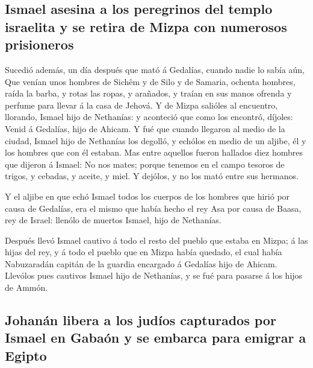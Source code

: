 \hypertarget{ismael-asesina-a-los-peregrinos-del-templo-israelita-y-se-retira-de-mizpa-con-numerosos-prisioneros}{%
\subsection{Ismael asesina a los peregrinos del templo israelita y se
retira de Mizpa con numerosos
prisioneros}\label{ismael-asesina-a-los-peregrinos-del-templo-israelita-y-se-retira-de-mizpa-con-numerosos-prisioneros}}

 Sucedió además, un día después que mató á Gedalías, cuando
nadie lo sabía aún,  Que venían unos hombres de Sichêm y de
Silo y de Samaria, ochenta hombres, raída la barba, y rotas las ropas, y
arañados, y traían en sus manos ofrenda y perfume para llevar á la casa
de Jehová.  Y de Mizpa salióles al encuentro, llorando,
Ismael hijo de Nethanías: y aconteció que como los encontró, díjoles:
Venid á Gedalías, hijo de Ahicam.  Y fué que cuando llegaron
al medio de la ciudad, Ismael hijo de Nethanías los degolló, y echólos
en medio de un aljibe, él y los hombres que con él estaban. 
Mas entre aquellos fueron hallados diez hombres que dijeron á Ismael: No
nos mates; porque tenemos en el campo tesoros de trigos, y cebadas, y
aceite, y miel. Y dejólos, y no los mató entre sus hermanos.

 Y el aljibe en que echó Ismael todos los cuerpos de los
hombres que hirió por causa de Gedalías, era el mismo que había hecho el
rey Asa por causa de Baasa, rey de Israel: llenólo de muertos Ismael,
hijo de Nethanías.

 Después llevó Ismael cautivo á todo el resto del pueblo
que estaba en Mizpa; á las hijas del rey, y á todo el pueblo que en
Mizpa había quedado, el cual había Nabuzaradán capitán de la guardia
encargado á Gedalías hijo de Ahicam. Llevólos pues cautivos Ismael hijo
de Nethanías, y se fué para pasarse á los hijos de Ammón.

\hypertarget{johanuxe1n-libera-a-los-juduxedos-capturados-por-ismael-en-gabauxf3n-y-se-embarca-para-emigrar-a-egipto}{%
\subsection{Johanán libera a los judíos capturados por Ismael en Gabaón
y se embarca para emigrar a
Egipto}\label{johanuxe1n-libera-a-los-juduxedos-capturados-por-ismael-en-gabauxf3n-y-se-embarca-para-emigrar-a-egipto}}

